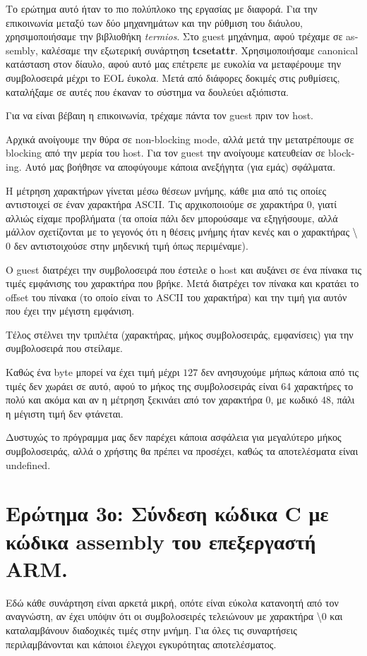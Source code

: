 \documentclass{article}
\newcommand{\english}[1]{\foreignlanguage{english}{{#1}}}
\begin{document}
Το ερώτημα αυτό ήταν το πιο πολύπλοκο της εργασίας με διαφορά. Για την επικοινωνία μεταξύ των δύο μηχανημάτων και την ρύθμιση του διάυλου, χρησιμοποιήσαμε την βιβλιοθήκη \english{\textit{termios}}. Στο \english{guest} μηχάνημα, αφού τρέχαμε σε \english{assembly}, καλέσαμε την εξωτερική συνάρτηση \english{\textbf{tcsetattr}}. Χρησιμοποιήσαμε \english{canonical} κατάσταση στον δίαυλο, αφού αυτό μας επέτρεπε με ευκολία να μεταφέρουμε την συμβολοσειρά μέχρι το \english{EOL} έυκολα. Μετά από διάφορες δοκιμές στις ρυθμίσεις, καταλήξαμε σε αυτές που έκαναν το σύστημα να δουλεύει αξιόπιστα.

Για να είναι βέβαιη η επικοινωνία, τρέχαμε πάντα τον \english{guest} πριν τον \english{host}. 

Αρχικά ανοίγουμε την θύρα σε \english{non-blocking mode}, αλλά μετά την μετατρέπουμε σε \english{blocking} από την μερία του \english{host}. Για τον \english{guest} την ανοίγουμε κατευθείαν σε \english{blocking}. Αυτό μας βοήθησε να αποφύγουμε κάποια ανεξήγητα (για εμάς) σφάλματα.

Η μέτρηση χαρακτήρων γίνεται μέσω θέσεων μνήμης, κάθε μια από τις οποίες αντιστοιχεί σε έναν χαρακτήρα \english{ASCII}. Τις αρχικοποιούμε σε χαρακτήρα $0$, γιατί αλλιώς είχαμε προβλήματα (τα οποία πάλι δεν μπορούσαμε να εξηγήσουμε, αλλά μάλλον σχετίζονται με το γεγονός ότι η θέσεις μνήμης ήταν κενές και ο χαρακτήρας \textbackslash$0$ δεν αντιστοιχούσε στην μηδενική τιμή όπως περιμέναμε). 

Ο \english{guest} διατρέχει την συμβολοσειρά που έστειλε ο \english{host} και αυξάνει σε ένα πίνακα τις τιμές εμφάνισης του χαρακτήρα που βρήκε. Μετά διατρέχει τον πίνακα και κρατάει το \english{offset} του πίνακα (το οποίο είναι το \english{ASCII} του χαρακτήρα) και την τιμή για αυτόν που έχει την μέγιστη εμφάνιση. 

Τέλος στέλνει την τριπλέτα (χαρακτήρας, μήκος συμβολοσειράς, εμφανίσεις) για την συμβολοσειρά που στείλαμε. 

Καθώς ένα \english{byte} μπορεί να έχει τιμή μέχρι $127$ δεν ανησυχούμε μήπως κάποια από τις τιμές δεν χωράει σε αυτό, αφού το μήκος της συμβολοσειράς είναι 64 χαρακτήρες το πολύ και ακόμα και αν η μέτρηση ξεκινάει από τον χαρακτήρα $0$, με κωδικό $48$, πάλι η μέγιστη τιμή δεν φτάνεται. 

Δυστυχώς το πρόγραμμα μας δεν παρέχει κάποια ασφάλεια για μεγαλύτερο μήκος συμβολοσειράς, αλλά ο χρήστης θα πρέπει να προσέχει, καθώς τα αποτελέσματα είναι \english{undefined}.

\section*{Ερώτημα 3ο: Σύνδεση κώδικα \english{C} με κώδικα \english{assembly} του επεξεργαστή \english{ARM}.}

Εδώ κάθε συνάρτηση είναι αρκετά μικρή, οπότε είναι εύκολα κατανοητή από τον αναγνώστη, αν έχει υπόψιν ότι οι συμβολοσειρές τελειώνουν με χαρακτήρα \textbackslash 0 και καταλαμβάνουν διαδοχικές τιμές στην μνήμη. Για όλες τις συναρτήσεις περιλαμβάνονται και κάποιοι έλεγχοι εγκυρότητας αποτελέσματος.
\end{document}
